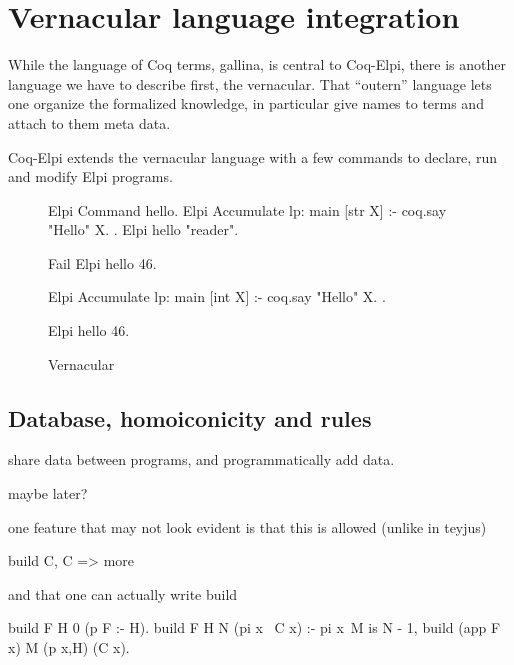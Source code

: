 \documentclass[a4paper, 11pt]{book}
\begin{document}


\section{Vernacular language integration}

While the language of Coq terms, gallina, is central to Coq-Elpi, there is another
language we have to describe first, the vernacular. That ``outern'' language
lets one organize the formalized knowledge, in particular give names to terms
and attach to them meta data.

Coq-Elpi extends the vernacular language with a few commands to declare, run
and modify Elpi programs.



\begin{figure}
\begin{coqcode}
Elpi Command hello.
Elpi Accumulate lp:{{
  main [str X] :- coq.say "Hello" X.
}}.
Elpi hello "reader".

Fail Elpi hello 46.

Elpi Accumulate lp:{{
  main [int X] :- coq.say "Hello" X.
}}.

Elpi hello 46.
\end{coqcode}
\caption[Vernacular]{Vernacular\label{vernac}}
\end{figure}

\subsection{Database, homoiconicity and rules}

share data between programs, and programmatically add data.

maybe later?

one feature that may not look evident is that
this is allowed (unlike in teyjus)
\begin{elpicode}
build C, C => more
\end{elpicode}

and that one can actually write build

\begin{elpicode}
build F H 0 (p F :- H).
build F H N (pi x \ C x) :-
  pi x\ 
    M is N - 1,
    build (app F x) M (p x,H) (C x).
\end{elpicode}
\end{document}
